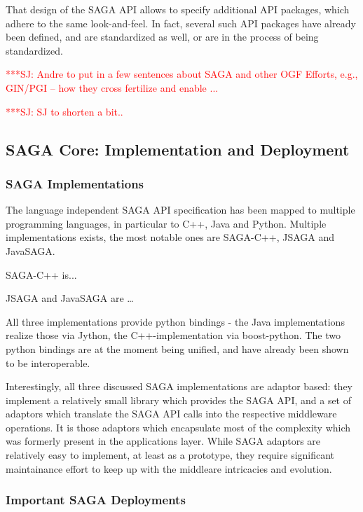 \documentclass[12pt]{article}
\newcommand{\jhanote}[1]{ {\textcolor{red}     {***SJ: #1}}}
\newcommand{\jhanote}[1]{}
\begin{document}
  That design of the SAGA API allows to specify additional API
  packages, which adhere to the same look-and-feel.  In fact, several
  such API packages have already been defined, and are standardized as
  well, or are in the process of being standardized.

  \jhanote{Andre to put in a few sentences about SAGA and other OGF
    Efforts, e.g., GIN/PGI -- how they cross fertilize and enable ...}

  \jhanote{SJ to shorten a bit..}

  \subsection{SAGA Core: Implementation and Deployment}

  \subsubsection{SAGA Implementations}

  The language independent SAGA API specification has been mapped to
  multiple programming languages, in particular to C++, Java and
  Python.  Multiple implementations exists, the most notable ones are
  SAGA-C++, JSAGA and JavaSAGA.

  SAGA-C++ is...

  JSAGA and JavaSAGA are …

  All three implementations provide python bindings - the Java
  implementations realize those via Jython, the C++-implementation via
  boost-python.  The two python bindings are at the moment being
  unified, and have already been shown to be interoperable.

  Interestingly, all three discussed SAGA implementations are adaptor
  based: they implement a relatively small library which provides the
  SAGA API, and a set of adaptors which translate the SAGA API calls
  into the respective middleware operations.  It is those adaptors
  which encapsulate most of the complexity which was formerly present
  in the applications layer.  While SAGA adaptors are relatively easy
  to implement, at least as a prototype, they require significant
  maintainance effort to keep up with the middleare intricacies and
  evolution.


  \subsubsection{Important SAGA Deployments}
\end{document}
